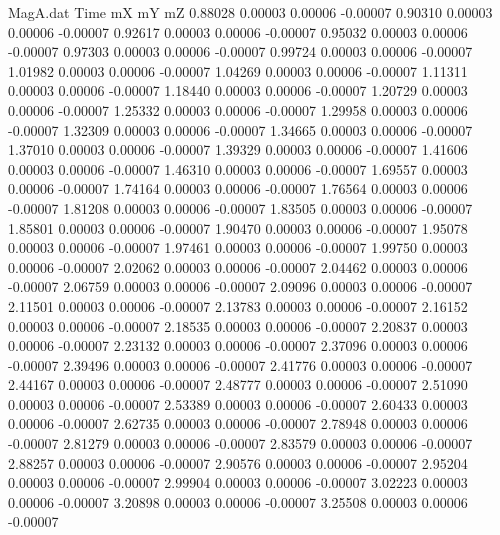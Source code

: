 \begin{filecontents}{MagA.dat}
Time mX mY mZ
   0.88028    0.00003    0.00006   -0.00007
   0.90310    0.00003    0.00006   -0.00007
   0.92617    0.00003    0.00006   -0.00007
   0.95032    0.00003    0.00006   -0.00007
   0.97303    0.00003    0.00006   -0.00007
   0.99724    0.00003    0.00006   -0.00007
   1.01982    0.00003    0.00006   -0.00007
   1.04269    0.00003    0.00006   -0.00007
   1.11311    0.00003    0.00006   -0.00007
   1.18440    0.00003    0.00006   -0.00007
   1.20729    0.00003    0.00006   -0.00007
   1.25332    0.00003    0.00006   -0.00007
   1.29958    0.00003    0.00006   -0.00007
   1.32309    0.00003    0.00006   -0.00007
   1.34665    0.00003    0.00006   -0.00007
   1.37010    0.00003    0.00006   -0.00007
   1.39329    0.00003    0.00006   -0.00007
   1.41606    0.00003    0.00006   -0.00007
   1.46310    0.00003    0.00006   -0.00007
   1.69557    0.00003    0.00006   -0.00007
   1.74164    0.00003    0.00006   -0.00007
   1.76564    0.00003    0.00006   -0.00007
   1.81208    0.00003    0.00006   -0.00007
   1.83505    0.00003    0.00006   -0.00007
   1.85801    0.00003    0.00006   -0.00007
   1.90470    0.00003    0.00006   -0.00007
   1.95078    0.00003    0.00006   -0.00007
   1.97461    0.00003    0.00006   -0.00007
   1.99750    0.00003    0.00006   -0.00007
   2.02062    0.00003    0.00006   -0.00007
   2.04462    0.00003    0.00006   -0.00007
   2.06759    0.00003    0.00006   -0.00007
   2.09096    0.00003    0.00006   -0.00007
   2.11501    0.00003    0.00006   -0.00007
   2.13783    0.00003    0.00006   -0.00007
   2.16152    0.00003    0.00006   -0.00007
   2.18535    0.00003    0.00006   -0.00007
   2.20837    0.00003    0.00006   -0.00007
   2.23132    0.00003    0.00006   -0.00007
   2.37096    0.00003    0.00006   -0.00007
   2.39496    0.00003    0.00006   -0.00007
   2.41776    0.00003    0.00006   -0.00007
   2.44167    0.00003    0.00006   -0.00007
   2.48777    0.00003    0.00006   -0.00007
   2.51090    0.00003    0.00006   -0.00007
   2.53389    0.00003    0.00006   -0.00007
   2.60433    0.00003    0.00006   -0.00007
   2.62735    0.00003    0.00006   -0.00007
   2.78948    0.00003    0.00006   -0.00007
   2.81279    0.00003    0.00006   -0.00007
   2.83579    0.00003    0.00006   -0.00007
   2.88257    0.00003    0.00006   -0.00007
   2.90576    0.00003    0.00006   -0.00007
   2.95204    0.00003    0.00006   -0.00007
   2.99904    0.00003    0.00006   -0.00007
   3.02223    0.00003    0.00006   -0.00007
   3.20898    0.00003    0.00006   -0.00007
   3.25508    0.00003    0.00006   -0.00007

\end{filecontents}
